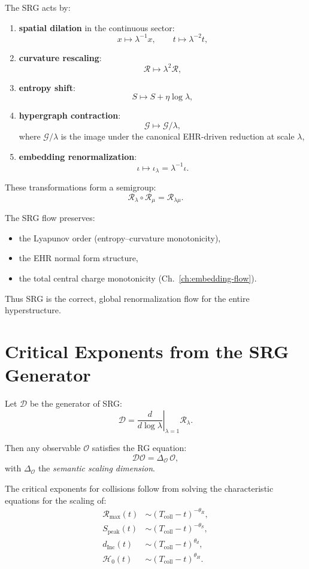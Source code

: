 The SRG acts by:
\begin{enumerate}
\item \textbf{spatial dilation} in the continuous sector:
  \[
  x \mapsto \lambda^{-1}x, \qquad t \mapsto \lambda^{-2}t,
  \]
\item \textbf{curvature rescaling}:
  \[
  \mathcal{R} \mapsto \lambda^2 \mathcal{R},
  \]
\item \textbf{entropy shift}:
  \[
  S \mapsto S + \eta \log\lambda,
  \]
\item \textbf{hypergraph contraction}:
  \[
  \mathcal{G} \mapsto \mathcal{G}/\lambda,
  \]
where $\mathcal{G}/\lambda$ is the image under the canonical EHR-driven reduction at scale $\lambda$,
\item \textbf{embedding renormalization}:
  \[
  \iota \mapsto \iota_\lambda = \lambda^{-1}\iota.
  \]
\end{enumerate}

These transformations form a semigroup:
\[
\mathcal{R}_\lambda\circ\mathcal{R}_\mu = \mathcal{R}_{\lambda\mu}.
\]

The SRG flow preserves:
\begin{itemize}
\item the Lyapunov order (entropy–curvature monotonicity),  
\item the EHR normal form structure,  
\item the total central charge monotonicity (Ch.~\ref{ch:embedding-flow}).  
\end{itemize}

Thus SRG is the correct, global renormalization flow for the entire hyperstructure.

\section{Critical Exponents from the SRG Generator}

Let $\mathcal{D}$ be the generator of SRG:
\[
\mathcal{D}
  = \left.\frac{d}{d\log\lambda}\right|_{\lambda=1}\mathcal{R}_\lambda.
\]

Then any observable $\mathcal{O}$ satisfies the RG equation:
\[
\mathcal{D}\mathcal{O} = \Delta_{\mathcal{O}}\,\mathcal{O},
\]
with $\Delta_{\mathcal{O}}$ the \emph{semantic scaling dimension}.

The critical exponents for collisions follow from solving the characteristic equations for the scaling of:
\begin{align*}
\mathcal{R}_{\max}(t) &\sim (T_{\mathrm{coll}} - t)^{-\theta_R}, \\
S_{\mathrm{peak}}(t) &\sim (T_{\mathrm{coll}} - t)^{-\theta_S}, \\
d_{\mathrm{Inc}}(t) &\sim (T_{\mathrm{coll}} - t)^{\theta_d}, \\
\mathcal{H}_0(t) &\sim (T_{\mathrm{coll}} - t)^{\theta_H}.
\end{align*}

